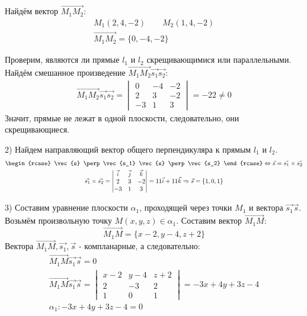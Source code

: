 \begin{eg}
  Найдём вектор $\overrightarrow{M_1M_2}$:
  \begin{gather*}
    M_1(2, 4, -2) \qquad M_2(1, 4, -2) \\
    \overrightarrow{M_1M_2} = \{0, -4, -2\} 
  \end{gather*}

  Проверим, являются ли прямые $l_1$ и $l_2$ скрещивающимися или параллельными. Найдём смешанное произведение $\overrightarrow{M_1M_2} \vec{s_1} \vec{s_2}$:
  \begin{gather*}
    \overrightarrow{M_1M_2} \vec{s_1} \vec{s_2} = 
    \begin{vmatrix}
      0 & -4 & -2 \\
      2 & 3 & -2 \\
      -3 & 1 & 3
    \end{vmatrix} = -22 \neq 0
  \end{gather*}
  Значит, прямые не лежат в одной плоскости, следовательно, они скрещивающиеся.

  2) Найдем направляющий вектор общего перпендикуляра к прямым $l_1$ и $l_2$.
  \begin{gather*}
    \begin{rcase}
      \vec{s} \perp \vec{s_1}
      \vec{s} \perp \vec{s_2}
    \end{rcase}
    \iff \vec{s} = \vec{s_1} \times \vec{s_2} \\
    \vec{s_1} \times \vec{s_2} = 
    \begin{vmatrix}
      \vec{i} & \vec{j} & \vec{k} \\
      2 & 3 & -2 \\
      -3 & 1 & 3
    \end{vmatrix} = 11 \vec{i} + 11 \vec{k} \implies \vec{s} = \{1, 0, 1\} \\ 
  \end{gather*}

  3) Составим уравнение плоскости $\alpha_1$, проходящей через точки $M_1$ и вектора $\vec{s_1} \vec{s}$. 
  Возьмём произвольную точку $M(x, y, z) \in \alpha_1$.
  Составим вектор $\overrightarrow{M_1M}$: \[
  \overrightarrow{M_1M} = \{x - 2, y - 4, z + 2\} 
  \]
  Вектора $\overrightarrow{M_1M}, \vec{s_1}, \vec{s}$ - компланарные, а следовательно: 
  \begin{gather*}
    \overrightarrow{M_1M} \vec{s_1} \vec{s} = 0 \\
    \vec{M_1M} \vec{s_1} \vec{s} = 
    \begin{vmatrix}
      x - 2 & y - 4 & z + 2 \\
      2 & -3 & 2 \\
      1 & 0 & 1
    \end{vmatrix} = 
    -3x + 4y + 3z  - 4\\
    \boxed{\alpha_1: -3x + 4y + 3z - 4 = 0}
  \end{gather*}


\end{eg}
